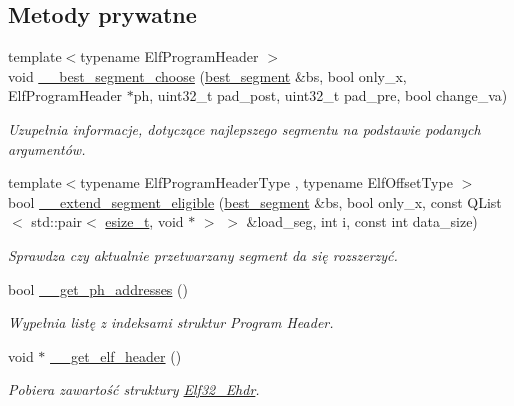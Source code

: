 \subsection*{Metody prywatne}
\begin{DoxyCompactItemize}
\item 
{\footnotesize template$<$typename Elf\-Program\-Header $>$ }\\void \hyperlink{class_e_l_f_a2418b755f55687748e070983e7c69234}{\-\_\-\-\_\-best\-\_\-segment\-\_\-choose} (\hyperlink{class_e_l_f_acc32d4569fb28ff6c041c20870d8c2e7}{best\-\_\-segment} \&bs, bool only\-\_\-x, Elf\-Program\-Header $\ast$ph, uint32\-\_\-t pad\-\_\-post, uint32\-\_\-t pad\-\_\-pre, bool change\-\_\-va)
\begin{DoxyCompactList}\small\item\em Uzupełnia informacje, dotyczące najlepszego segmentu na podstawie podanych argumentów. \end{DoxyCompactList}\item 
{\footnotesize template$<$typename Elf\-Program\-Header\-Type , typename Elf\-Offset\-Type $>$ }\\bool \hyperlink{class_e_l_f_a2f3e6694514eaf1d1e16ec871ac273ff}{\-\_\-\-\_\-extend\-\_\-segment\-\_\-eligible} (\hyperlink{class_e_l_f_acc32d4569fb28ff6c041c20870d8c2e7}{best\-\_\-segment} \&bs, bool only\-\_\-x, const Q\-List$<$ std\-::pair$<$ \hyperlink{elffile_8h_a893a6f75ff12b6fb48772f3afb8f1d7d}{esize\-\_\-t}, void $\ast$ $>$ $>$ \&load\-\_\-seg, int i, const int data\-\_\-size)
\begin{DoxyCompactList}\small\item\em Sprawdza czy aktualnie przetwarzany segment da się rozszerzyć. \end{DoxyCompactList}\item 
bool \hyperlink{class_e_l_f_a0d65a37a3d2a5027110e52272329c398}{\-\_\-\-\_\-get\-\_\-ph\-\_\-addresses} ()
\begin{DoxyCompactList}\small\item\em Wypełnia listę z indeksami struktur Program Header. \end{DoxyCompactList}\item 
void $\ast$ \hyperlink{class_e_l_f_a8014a3000e257793350ef0a94576aaa4}{\-\_\-\-\_\-get\-\_\-elf\-\_\-header} ()
\begin{DoxyCompactList}\small\item\em Pobiera zawartość struktury \hyperlink{struct_elf32___ehdr}{Elf32\-\_\-\-Ehdr}. \end{DoxyCompactList}\item 

\end{DoxyCompactItemize}
